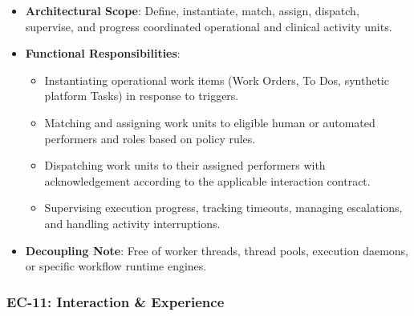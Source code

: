 \begin{itemize}

\item 
\textbf{Architectural Scope}: Define, instantiate, match, assign, dispatch, supervise, and progress coordinated operational and clinical activity units.



\item 
\textbf{Functional Responsibilities}:


\begin{itemize}

\item 
Instantiating operational work items (Work Orders, To Dos, synthetic platform Tasks) in response to triggers.



\item 
Matching and assigning work units to eligible human or automated performers and roles based on policy rules.



\item 
Dispatching work units to their assigned performers with acknowledgement according to the applicable interaction contract.



\item 
Supervising execution progress, tracking timeouts, managing escalations, and handling activity interruptions.



\end{itemize}


\item 
\textbf{Decoupling Note}: Free of worker threads, thread pools, execution daemons, or specific workflow runtime engines.



\end{itemize}
\label{rad:enterprise:193}
\subsubsection*{EC-11: Interaction \& Experience}
\label{rad:enterprise:194}

